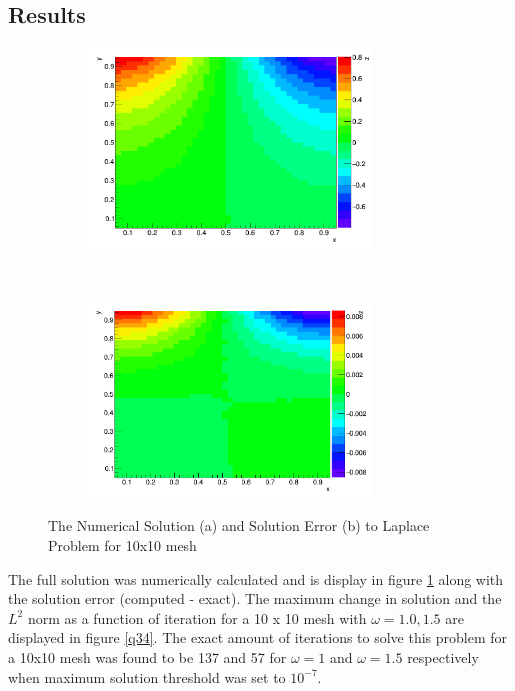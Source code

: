 \documentclass[paper=a4, fontsize=11pt, abstract=on]{scrartcl}
\numberwithin{equation}{section}		%
\numberwithin{figure}{section}			%
\numberwithin{table}{section}				%
\begin{document}
\subsection{Results}

\begin{figure}[H]
        \centering
        \begin{subfigure}[h]{0.5\textwidth}
                \includegraphics[width = 7.5cm]{qq21}
                \caption{}
				
        \end{subfigure}%
       ~~~~~
        \begin{subfigure}[h]{0.5\textwidth}
                \includegraphics[width = 7.5cm]{qq22}
                \caption{}
                
        \end{subfigure}
        \caption{The Numerical Solution (a) and Solution Error (b) to Laplace Problem for 10x10 mesh  }
        \label{3d}
\end{figure}





The full solution was numerically calculated and is display in figure \ref{3d} along with the solution error (computed - exact). The maximum change in solution and the $L^2$ norm as a function of iteration for a 10 x 10 mesh with $\omega = 1.0,1.5$ are displayed in figure \ref{q34}.  The exact amount of iterations to solve this problem for a 10x10 mesh was found to be 137 and 57 for $\omega = 1$ and $\omega = 1.5$ respectively when maximum solution threshold was set to $10^{-7}$. 
\end{document}

